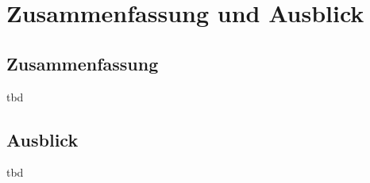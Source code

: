 \chapter{Zusammenfassung und Ausblick}

%
%
%
\section{Zusammenfassung}
tbd

%
%
%
\section{Ausblick}
tbd